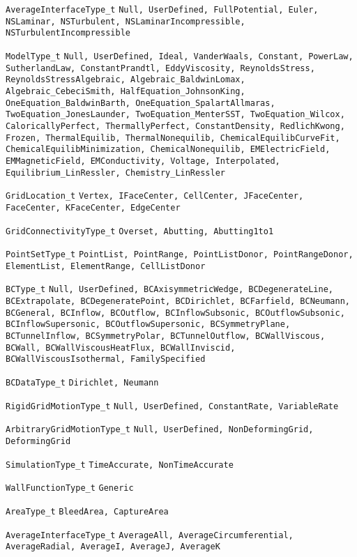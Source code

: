 {\begin{Ventryi}{\texttt{AverageInterfaceType\_t}}
         \texttt{Null, UserDefined, FullPotential, Euler, NSLaminar,
         NSTurbulent, NSLaminarIncompressible,
         NSTurbulentIncompressible}
   \item [\texttt{ModelType\_t}]
         \texttt{Null, UserDefined, Ideal, VanderWaals, Constant,
         PowerLaw, SutherlandLaw, ConstantPrandtl, EddyViscosity,
         ReynoldsStress, ReynoldsStressAlgebraic,
         Algebraic\_BaldwinLomax, Algebraic\_CebeciSmith,
         HalfEquation\_JohnsonKing, OneEquation\_BaldwinBarth,
         OneEquation\_SpalartAllmaras, TwoEquation\_JonesLaunder,
         TwoEquation\_MenterSST, TwoEquation\_Wilcox,
	 CaloricallyPerfect, ThermallyPerfect,
	 ConstantDensity, RedlichKwong,
	 Frozen, ThermalEquilib, ThermalNonequilib,
	 ChemicalEquilibCurveFit, ChemicalEquilibMinimization,
	 ChemicalNonequilib, EMElectricField, EMMagneticField,
         EMConductivity, Voltage, Interpolated,
         Equilibrium\_LinRessler, Chemistry\_LinRessler}
   \item [\texttt{GridLocation\_t}]
         \texttt{Vertex, IFaceCenter, CellCenter, JFaceCenter,
         FaceCenter, KFaceCenter, EdgeCenter}
   \item [\texttt{GridConnectivityType\_t}]
         \texttt{Overset, Abutting, Abutting1to1}
   \item [\texttt{PointSetType\_t}]
         \texttt{PointList, PointRange, PointListDonor, PointRangeDonor,
         ElementList, ElementRange, CellListDonor}
   \item [\texttt{BCType\_t}]
         \texttt{Null, UserDefined, BCAxisymmetricWedge,
         BCDegenerateLine, BCExtrapolate,
         BCDegeneratePoint, BCDirichlet, BCFarfield, BCNeumann,
         BCGeneral, BCInflow, BCOutflow, BCInflowSubsonic,
         BCOutflowSubsonic, BCInflowSupersonic,
         BCOutflowSupersonic, BCSymmetryPlane, BCTunnelInflow,
         BCSymmetryPolar, BCTunnelOutflow, BCWallViscous,
         BCWall, BCWallViscousHeatFlux, BCWallInviscid,
         BCWallViscousIsothermal, FamilySpecified}
   \item [\texttt{BCDataType\_t}]
         \texttt{Dirichlet, Neumann}
   \item [\texttt{RigidGridMotionType\_t}]
         \texttt{Null, UserDefined, ConstantRate, VariableRate}
   \item [\texttt{ArbitraryGridMotionType\_t}]
         \texttt{Null, UserDefined, NonDeformingGrid, DeformingGrid}
   \item [\texttt{SimulationType\_t}]
         \texttt{TimeAccurate, NonTimeAccurate}
   \item [\texttt{WallFunctionType\_t}]
         \texttt{Generic}
   \item [\texttt{AreaType\_t}]
         \texttt{BleedArea, CaptureArea}
   \item [\texttt{AverageInterfaceType\_t}]
         \texttt{AverageAll, AverageCircumferential, AverageRadial, AverageI,
	 AverageJ, AverageK}
\end{Ventryi}
}

